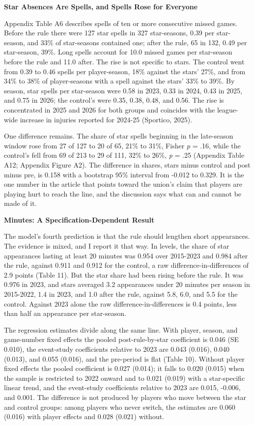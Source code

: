 \documentclass[12pt]{article}
\newcommand{\ltwo}[1]{\par\medskip\noindent\textbf{#1}\par\nopagebreak}
\begin{document}
\ltwo{Star Absences Are Spells, and Spells Rose for Everyone}


Appendix Table A6 describes spells of ten or more consecutive missed games. Before the rule there were 127 star spells in 327 star-seasons, 0.39 per star-season, and 33\% of star-seasons contained one; after the rule, 65 in 132, 0.49 per star-season, 39\%. Long spells account for 10.0 missed games per star-season before the rule and 11.0 after. The rise is not specific to stars. The control went from 0.39 to 0.46 spells per player-season, 18\% against the stars' 27\%, and from 34\% to 38\% of player-seasons with a spell against the stars' 33\% to 39\%. By season, star spells per star-season were 0.58 in 2023, 0.33 in 2024, 0.43 in 2025, and 0.75 in 2026; the control's were 0.35, 0.38, 0.48, and 0.56. The rise is concentrated in 2025 and 2026 for both groups and coincides with the league-wide increase in injuries reported for 2024-25 (Sportico, 2025).

One difference remains. The share of star spells beginning in the late-season window rose from 27 of 127 to 20 of 65, 21\% to 31\%, Fisher \emph{p} = .16, while the control's fell from 69 of 213 to 29 of 111, 32\% to 26\%, \emph{p} = .25 (Appendix Table A12; Appendix Figure A2). The difference in shares, stars minus control and post minus pre, is 0.158 with a bootstrap 95\% interval from -0.012 to 0.329. It is the one number in the article that points toward the union's claim that players are playing hurt to reach the line, and the discussion says what can and cannot be made of it.


\ltwo{Minutes: A Specification-Dependent Result}


The model's fourth prediction is that the rule should lengthen short appearances. The evidence is mixed, and I report it that way. In levels, the share of star appearances lasting at least 20 minutes was 0.954 over 2015-2023 and 0.984 after the rule, against 0.911 and 0.912 for the control, a raw difference-in-differences of 2.9 points (Table 11). But the star share had been rising before the rule. It was 0.976 in 2023, and stars averaged 3.2 appearances under 20 minutes per season in 2015-2022, 1.4 in 2023, and 1.0 after the rule, against 5.8, 6.0, and 5.5 for the control. Against 2023 alone the raw difference-in-differences is 0.4 points, less than half an appearance per star-season.

The regression estimates divide along the same line. With player, season, and game-number fixed effects the pooled post-rule-by-star coefficient is 0.046 (SE 0.010), the event-study coefficients relative to 2023 are 0.043 (0.016), 0.040 (0.013), and 0.055 (0.016), and the pre-period is flat (Table 10). Without player fixed effects the pooled coefficient is 0.027 (0.014); it falls to 0.020 (0.015) when the sample is restricted to 2022 onward and to 0.021 (0.019) with a star-specific linear trend, and the event-study coefficients relative to 2023 are 0.015, -0.006, and 0.001. The difference is not produced by players who move between the star and control groups: among players who never switch, the estimates are 0.060 (0.016) with player effects and 0.028 (0.021) without.
\end{document}
